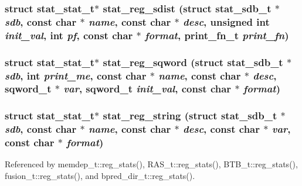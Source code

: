 \subsubsection[{stat\_\-reg\_\-sdist}]{\setlength{\rightskip}{0pt plus 5cm}struct {\bf stat\_\-stat\_\-t}$\ast$ stat\_\-reg\_\-sdist (struct {\bf stat\_\-sdb\_\-t} $\ast$ {\em sdb}, \/  const char $\ast$ {\em name}, \/  const char $\ast$ {\em desc}, \/  unsigned int {\em init\_\-val}, \/  int {\em pf}, \/  const char $\ast$ {\em format}, \/  {\bf print\_\-fn\_\-t} {\em print\_\-fn})\hspace{0.3cm}{\tt  [read]}}\label{zesto_2stats_8h_ac098a3587e13dc2a0767f54d46e98c5}


\subsubsection[{stat\_\-reg\_\-sqword}]{\setlength{\rightskip}{0pt plus 5cm}struct {\bf stat\_\-stat\_\-t}$\ast$ stat\_\-reg\_\-sqword (struct {\bf stat\_\-sdb\_\-t} $\ast$ {\em sdb}, \/  int {\em print\_\-me}, \/  const char $\ast$ {\em name}, \/  const char $\ast$ {\em desc}, \/  sqword\_\-t $\ast$ {\em var}, \/  sqword\_\-t {\em init\_\-val}, \/  const char $\ast$ {\em format})\hspace{0.3cm}{\tt  [read]}}\label{zesto_2stats_8h_6c7a4257d59d1a3f3d8056326d3ab3ba}


\subsubsection[{stat\_\-reg\_\-string}]{\setlength{\rightskip}{0pt plus 5cm}struct {\bf stat\_\-stat\_\-t}$\ast$ stat\_\-reg\_\-string (struct {\bf stat\_\-sdb\_\-t} $\ast$ {\em sdb}, \/  const char $\ast$ {\em name}, \/  const char $\ast$ {\em desc}, \/  const char $\ast$ {\em var}, \/  const char $\ast$ {\em format})\hspace{0.3cm}{\tt  [read]}}\label{zesto_2stats_8h_c8c6f5229297787dbce204434f45acce}




Referenced by memdep\_\-t::reg\_\-stats(), RAS\_\-t::reg\_\-stats(), BTB\_\-t::reg\_\-stats(), fusion\_\-t::reg\_\-stats(), and bpred\_\-dir\_\-t::reg\_\-stats().


